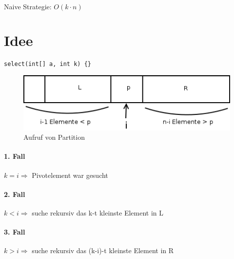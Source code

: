 Naive Strategie: $O(k \cdot n)$


\section{Idee} 

\begin{lstlisting}[style = pseudo]
select(int[] a, int k) {}
\end{lstlisting}

\begin{figure}[H]
	\centering
\includegraphics[width=0.6\linewidth]{06/Grafik/img5.png}
\caption{Aufruf von Partition}
\end{figure}

\paragraph{1. Fall} $k=i \Rightarrow$ Pivotelement war gesucht
\paragraph{2. Fall} $k<i \Rightarrow$ suche rekursiv das k-t kleinste Element in L 
\paragraph{3. Fall} $k>i \Rightarrow$ suche rekursiv das (k-i)-t kleinste Element in R
